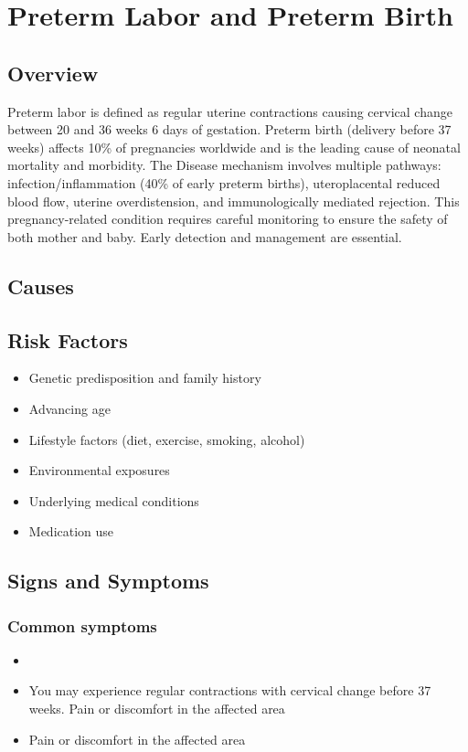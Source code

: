 \chapter{Preterm Labor and Preterm Birth}
\label{sec:Preterm Labor and Preterm Birth}

\section{Overview}
Preterm labor is defined as regular uterine contractions causing cervical change between 20 and 36 weeks 6 days of gestation. Preterm birth (delivery before 37 weeks) affects 10\% of pregnancies worldwide and is the leading cause of neonatal mortality and morbidity. The Disease mechanism involves multiple pathways: infection/inflammation (40\% of early preterm births), uteroplacental reduced blood flow, uterine overdistension, and immunologically mediated rejection. This pregnancy-related condition requires careful monitoring to ensure the safety of both mother and baby. Early detection and management are essential.
\section{Causes}
\section{Risk Factors}

\begin{itemize}[noitemsep]
  \item Genetic predisposition and family history
  \item Advancing age
  \item Lifestyle factors (diet, exercise, smoking, alcohol)
  \item Environmental exposures
  \item Underlying medical conditions
  \item Medication use
\end{itemize}
\section{Signs and Symptoms}

\subsection{Common symptoms}
\begin{itemize}[noitemsep]
  \item \item You may experience regular contractions with cervical change before 37 weeks. Pain or discomfort in the affected area    \item Pain or discomfort in the affected area
  \end{itemize}

